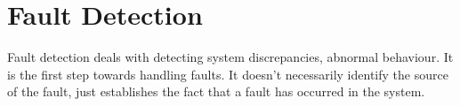 \chapter{Fault Detection}

Fault detection deals with detecting system discrepancies, abnormal behaviour. It is the first step towards handling faults. It doesn't necessarily identify the source of the fault, just establishes the fact that a fault has occurred in the system.


